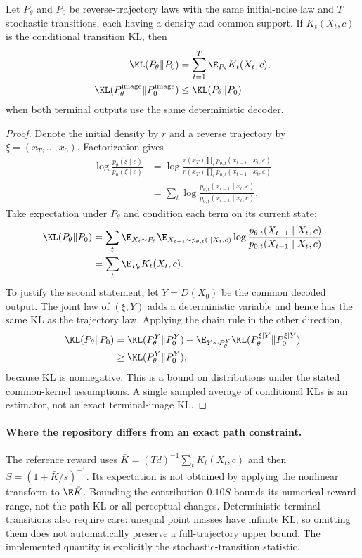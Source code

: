 \begin{proposition}
Let $P_\theta$ and $P_0$ be reverse-trajectory laws with the same initial-noise law and $T$ stochastic transitions, each having a density and common support. If $K_t(X_t,c)$ is the conditional transition KL, then
\begin{align}
\KL(P_\theta\Vert P_0)&=\sum_{t=1}^T\E_{P_\theta}K_t(X_t,c),\\
\KL(P_\theta^{\rm image}\Vert P_0^{\rm image})&\leq\KL(P_\theta\Vert P_0)
\end{align}
when both terminal outputs use the same deterministic decoder.
\end{proposition}
\begin{proof}
Denote the initial density by $r$ and a reverse trajectory by $\xi=(x_T,\ldots,x_0)$. Factorization gives
\begin{align}
\log\frac{p_\theta(\xi\mid c)}{p_0(\xi\mid c)}
&=\log\frac{r(x_T)\prod_t p_{\theta,t}(x_{t-1}\mid x_t,c)}
 {r(x_T)\prod_t p_{0,t}(x_{t-1}\mid x_t,c)}\\
&=\sum_t\log\frac{p_{\theta,t}(x_{t-1}\mid x_t,c)}
 {p_{0,t}(x_{t-1}\mid x_t,c)}.
\end{align}
Take expectation under $P_\theta$ and condition each term on its current state:
\begin{align}
\KL(P_\theta\Vert P_0)
&=\sum_t\E_{X_t\sim P_\theta}
 \E_{X_{t-1}\sim p_{\theta,t}(\cdot\mid X_t,c)}
 \log\frac{p_{\theta,t}(X_{t-1}\mid X_t,c)}{p_{0,t}(X_{t-1}\mid X_t,c)}\\
&=\sum_t\E_{P_\theta}K_t(X_t,c).
\end{align}
To justify the second statement, let $Y=D(X_0)$ be the common decoded output. The joint law of $(\xi,Y)$ adds a deterministic variable and hence has the same KL as the trajectory law. Applying the chain rule in the other direction,
\begin{align}
\KL(P_\theta\Vert P_0)
&=\KL(P_\theta^Y\Vert P_0^Y)
 +\E_{Y\sim P_\theta^Y}\KL(P_\theta^{\xi\mid Y}\Vert P_0^{\xi\mid Y})\\
&\geq\KL(P_\theta^Y\Vert P_0^Y),
\end{align}
because KL is nonnegative. This is a bound on distributions under the stated common-kernel assumptions. A single sampled average of conditional KLs is an estimator, not an exact terminal-image KL.
\end{proof}

\paragraph{Where the repository differs from an exact path constraint.}
The reference reward uses $\bar K=(Td)^{-1}\sum_tK_t(X_t,c)$ and then $S=(1+\bar K/s)^{-1}$. Its expectation is not obtained by applying the nonlinear transform to $\E\bar K$. Bounding the contribution $0.10S$ bounds its numerical reward range, not the path KL or all perceptual changes. Deterministic terminal transitions also require care: unequal point masses have infinite KL, so omitting them does not automatically preserve a full-trajectory upper bound. The implemented quantity is explicitly the stochastic-transition statistic.
